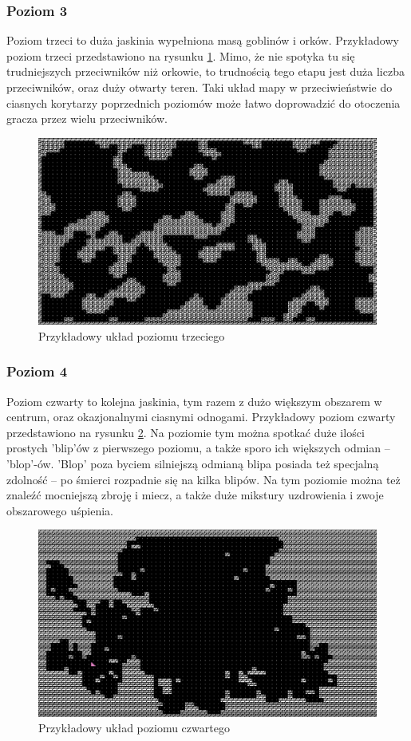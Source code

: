 \documentclass[12pt,twoside]{article}
\begin{document}
\subsubsection{Poziom 3}
Poziom trzeci to duża jaskinia wypełniona masą goblinów i orków. Przykładowy poziom trzeci przedstawiono na rysunku \ref{mygame:map3}. Mimo, że nie spotyka tu się trudniejszych przeciwników niż orkowie, to trudnością tego etapu jest duża liczba przeciwników, oraz duży otwarty teren. Taki układ mapy w przeciwieństwie do ciasnych korytarzy poprzednich poziomów może łatwo doprowadzić do otoczenia gracza przez wielu przeciwników.

\FloatBarrier
\begin{figure}[h]
	\centering
	\includegraphics[width=12cm]{images/mygame/map3.png}
	\caption{Przykładowy układ poziomu trzeciego}
	\label{mygame:map3}
\end{figure}
\FloatBarrier


\subsubsection{Poziom 4}
Poziom czwarty to kolejna jaskinia, tym razem z dużo większym obszarem w centrum, oraz okazjonalnymi ciasnymi odnogami. Przykładowy poziom czwarty przedstawiono na rysunku \ref{mygame:map4}. Na poziomie tym można spotkać duże ilości prostych 'blip'ów z pierwszego poziomu, a także sporo ich większych odmian -- 'blop'-ów. 'Blop' poza byciem silniejszą odmianą blipa posiada też specjalną zdolność -- po śmierci rozpadnie się na kilka blipów. Na tym poziomie można też znaleźć mocniejszą zbroję i miecz, a także duże mikstury uzdrowienia i zwoje obszarowego uśpienia.

\FloatBarrier
\begin{figure}[h]
	\centering
	\includegraphics[width=12cm]{images/mygame/map4.png}
	\caption{Przykładowy układ poziomu czwartego}
	\label{mygame:map4}
\end{figure}
\FloatBarrier
\end{document}

